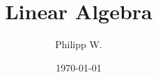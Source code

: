 \documentclass{article}
\begin{document}
\title{Linear Algebra}
\author{Philipp W.}
\date{\today}
\maketitle
\tableofcontents

\clearpage














\end{document}
